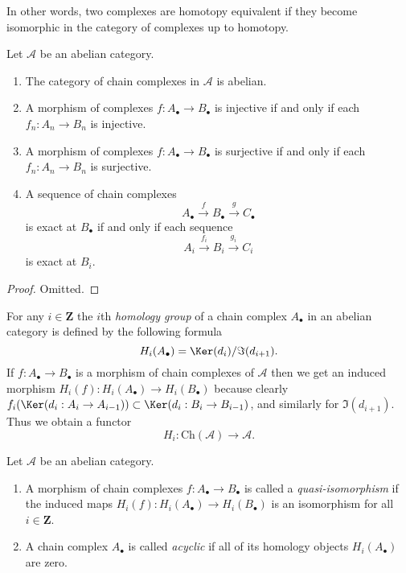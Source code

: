 \noindent
In other words, two complexes are homotopy equivalent if they become
isomorphic in the category of complexes up to homotopy.

\begin{lemma}
\label{lemma-cat-chain-abelian}
Let $\mathcal{A}$ be an abelian category.
\begin{enumerate}
\item The category of chain complexes in $\mathcal{A}$ is
abelian.
\item A morphism of complexes
$f : A_\bullet \to B_\bullet$ is injective
if and only if each $f_n : A_n \to B_n$ is injective.
\item A morphism of complexes
$f : A_\bullet \to B_\bullet$ is surjective
if and only if each $f_n : A_n \to B_n$ is surjective.
\item A sequence of chain complexes
$$
A_\bullet \xrightarrow{f} B_\bullet \xrightarrow{g} C_\bullet
$$
is exact at $B_\bullet$ if and only if each sequence
$$
A_i \xrightarrow{f_i} B_i \xrightarrow{g_i} C_i
$$
is exact at $B_i$.
\end{enumerate}
\end{lemma}

\begin{proof}
Omitted.
\end{proof}

\noindent
For any $i \in \mathbf{Z}$ the $i$th {\it homology group}
of a chain complex $A_\bullet$ in an abelian category is defined by
the following formula
$$
H_i(A_\bullet) = \Ker(d_i)/\Im(d_{i + 1}).
$$
If $f : A_\bullet \to B_\bullet$ is a morphism of chain
complexes of $\mathcal{A}$ then we get an induced
morphism $H_i(f) : H_i(A_\bullet) \to H_i(B_\bullet)$
because clearly
$f_i(\Ker(d_i : A_i \to A_{i - 1})) \subset
\Ker(d_i : B_i \to B_{i - 1})$, and similarly
for $\Im(d_{i + 1})$.
Thus we obtain a functor
$$
H_i : \text{Ch}(\mathcal{A}) \longrightarrow \mathcal{A}.
$$

\begin{definition}
\label{definition-quasi-isomorphism}
Let $\mathcal{A}$ be an abelian category.
\begin{enumerate}
\item A morphism of chain complexes $f : A_\bullet \to B_\bullet$
is called a {\it quasi-isomorphism} if the induced
maps $H_i(f) : H_i(A_\bullet) \to H_i(B_\bullet)$
is an isomorphism for all $i \in \mathbf{Z}$.
\item A chain complex $A_\bullet$ is called
{\it acyclic} if all of its homology objects
$H_i(A_\bullet)$ are zero.
\end{enumerate}
\end{definition}


